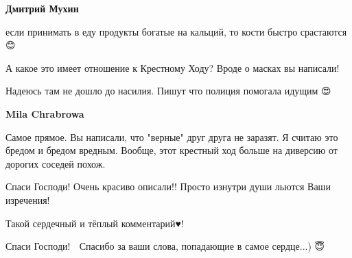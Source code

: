 \begin{itemize}
\begin{itemize}
 
\textbf{Дмитрий Мухин} 

если принимать в еду продукты богатые на кальций, то кости быстро срастаются 😊

А какое это имеет отношение к Крестному Ходу? Вроде о масках вы написали!

Надеюсь там не дошло до насилия. Пишут что полиция помогала идущим 😍

 
\textbf{Mila Chrabrowa} 

Самое прямое. Вы написали, что "верные" друг друга не
заразят. Я считаю это бредом и бредом вредным. Вообще, этот крестный ход больше
на диверсию от дорогих соседей похож.
\end{itemize}

 
Спаси Господи! Очень красиво описали!! Просто изнутри души льются Ваши изречения!

 
Такой сердечный и тёплый комментарий♥️!

 
Спаси Господи! 🙏 Спасибо за ваши слова, попадающие в самое сердце...) 😇

 


\end{itemize}
